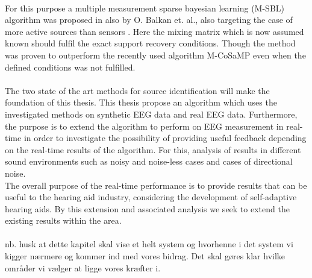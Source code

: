 \\
For this purpose a multiple measurement sparse bayesian learning (M-SBL) algorithm was proposed in \cite{Balkan2014} also by O. Balkan et. al., also targeting the case of more active sources than sensors \cite{Balkan2014}. Here the mixing matrix which is now assumed known should fulfil the exact support recovery conditions. Though the method was proven to outperform the recently used algorithm M-CoSaMP even when the defined conditions was not fulfilled.  
\\   
\\
The two state of the art methods for source identification will make the foundation of this thesis. This thesis propose an algorithm which uses the investigated methods on synthetic EEG data and real EEG data. Furthermore, the purpose is to extend the algorithm to perform on EEG measurement in real-time in order to investigate the possibility of providing useful feedback depending on the real-time results of the algorithm. For this, analysis of results in different sound environments such as noisy and noise-less cases and cases of directional noise.
\\
The overall purpose of the real-time performance is to provide results that can be useful to the hearing aid industry, considering the development of self-adaptive hearing aids. By this extension and associated analysis we seek to extend the existing results within the area.   
\\ \\
nb. husk at dette kapitel skal vise et helt system og hvorhenne i det system vi kigger nærmere og kommer ind med vores bidrag. Det skal gøres klar hvilke områder vi vælger at ligge vores kræfter i.  





 

